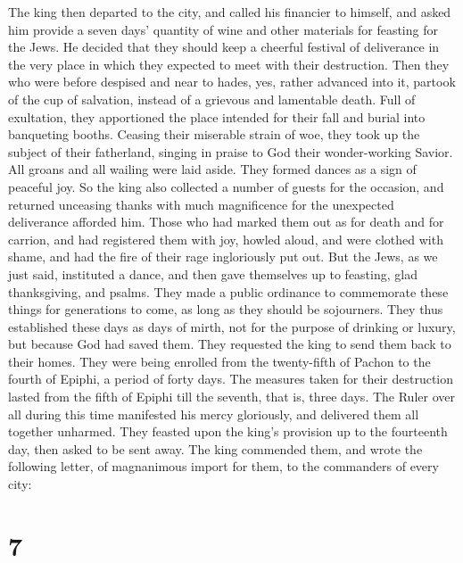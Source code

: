  The king then departed to the city, and called his
financier to himself, and asked him provide a seven days' quantity of
wine and other materials for feasting for the Jews. He decided that they
should keep a cheerful festival of deliverance in the very place in
which they expected to meet with their destruction.  Then
they who were before despised and near to hades, yes, rather advanced
into it, partook of the cup of salvation, instead of a grievous and
lamentable death. Full of exultation, they apportioned the place
intended for their fall and burial into banqueting booths. 
Ceasing their miserable strain of woe, they took up the subject of their
fatherland, singing in praise to God their wonder-working Savior. All
groans and all wailing were laid aside. They formed dances as a sign of
peaceful joy.  So the king also collected a number of
guests for the occasion, and returned unceasing thanks with much
magnificence for the unexpected deliverance afforded him. 
Those who had marked them out as for death and for carrion, and had
registered them with joy, howled aloud, and were clothed with shame, and
had the fire of their rage ingloriously put out.  But the
Jews, as we just said, instituted a dance, and then gave themselves up
to feasting, glad thanksgiving, and psalms.  They made a
public ordinance to commemorate these things for generations to come, as
long as they should be sojourners. They thus established these days as
days of mirth, not for the purpose of drinking or luxury, but because
God had saved them.  They requested the king to send them
back to their homes.  They were being enrolled from the
twenty-fifth of Pachon to the fourth of Epiphi, a period of forty days.
The measures taken for their destruction lasted from the fifth of Epiphi
till the seventh, that is, three days.  The Ruler over all
during this time manifested his mercy gloriously, and delivered them all
together unharmed.  They feasted upon the king's provision
up to the fourteenth day, then asked to be sent away.  The
king commended them, and wrote the following letter, of magnanimous
import for them, to the commanders of every city:

\hypertarget{section-6}{%
\section{7}\label{section-6}}

